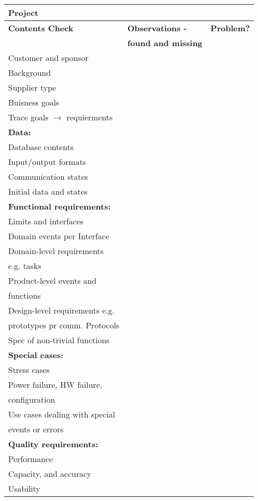 \documentclass[a4paper]{article}
\begin{document}
	\begin{tabular}{|l|l|l|} \hline 
		\multicolumn{3}{|l|}{\textbf{Project}} \\ \hline \hline
		\textbf{Contents Check}	& \textbf{Observations - }	& \textbf{Problem?} \\
			& \textbf{found and missing}	&	\\ \hline
		Customer and sponsor & & \\ \hline
		Background	&	&	\\ \hline
		Supplier type	&	&	\\ \hline
		Buisness goals	&	&	\\ \hline
		Trace goals \(\rightarrow\) requierments	&	&	\\ \hline
		\textbf{Data:}	&	&	\\ 
		Database contents	&	&	\\ \hline
		Input/output formats	&	&	\\ \hline
		Communication states	&	&	\\ \hline
		Initial data and states	&	&	\\ \hline
		\textbf{Functional requirements:}	&	&	\\
		Limits and interfaces	&	&	\\ \hline
		Domain events per Interface	&	&	\\ \hline
		Domain-level requirements	&	&	\\ 
		e.g. tasks	&	&	\\ \hline
		Product-level events and	&	&	\\
		functions	&	&	\\ \hline
		Design-level requirements e.g.	&	&	\\
		prototypes pr comm. Protocols	&	&	\\ \hline
		Spec of non-trivial functions	&	&	\\ \hline
		\textbf{Special cases:}	&	&	\\
		Stress cases	&	&	\\ \hline
		Power failure, HW failure,	&	&	\\
		configuration	&	&	\\ \hline
		Use cases dealing with special	&	&	\\
		events or errors	&	&	\\ \hline
		\textbf{Quality requirements:}	&	&	\\
		Performance	&	&	\\ \hline
		Capacity, and accuracy	&	&	\\ \hline
		Usability	&	&	\\ \hline

\end{tabular}
\end{document}
